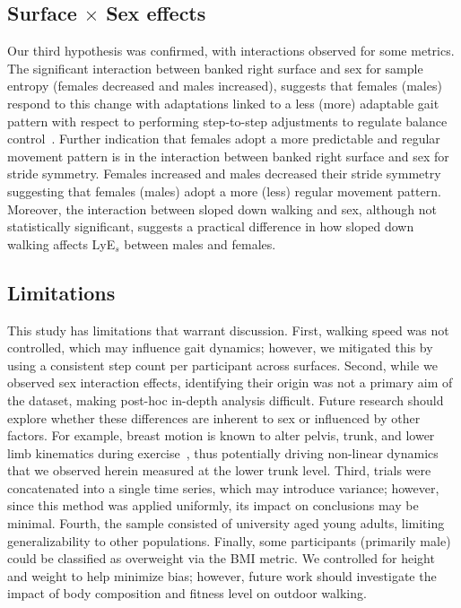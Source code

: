 \documentclass[authoryear,preprint,review,12pt]{elsarticle}
\begin{document}
\subsection{Surface $\times$ Sex effects}
Our third hypothesis was confirmed, with interactions observed for some metrics. The significant interaction between banked right surface and sex for sample entropy (females decreased and males increased), suggests that females (males) respond to this change with adaptations linked to a less (more) adaptable gait pattern with respect to performing step-to-step adjustments to regulate balance control~\citep{tochigi2012entropy, Zhang2013comprehensive}. Further indication that females adopt a more predictable and regular movement pattern is in the interaction between banked right surface and sex for stride symmetry. Females increased and males decreased their stride symmetry suggesting that females (males) adopt a more (less) regular movement pattern.
Moreover, the interaction between sloped down walking and sex, although not statistically significant, suggests a practical difference in how sloped down walking affects LyE${_s}$ between males and females. %


\subsection{Limitations}
This study has limitations that warrant discussion. First, walking speed was not controlled, which may influence gait dynamics; however, we mitigated this by using a consistent step count per participant across surfaces. Second, while we observed sex interaction effects, identifying their origin was not a primary aim of the dataset, making post-hoc in-depth analysis difficult. Future research should explore whether these differences are inherent to sex or influenced by other factors. For example, breast motion is known to alter pelvis, trunk, and lower limb kinematics during exercise~\citep{mcghee2020breast, fong2022greater, milligan2015influence}, thus potentially driving non-linear dynamics that we observed herein measured at the lower trunk level. Third, trials were concatenated into a single time series, which may introduce variance; however, since this method was applied uniformly, its impact on conclusions may be minimal. Fourth, the sample consisted of  university aged young adults, limiting generalizability to other populations. Finally, some participants (primarily male) could be classified as overweight via the BMI metric. We controlled for height and weight to help minimize bias; however, future work should investigate the impact of body composition and fitness level on outdoor walking.
\end{document}
